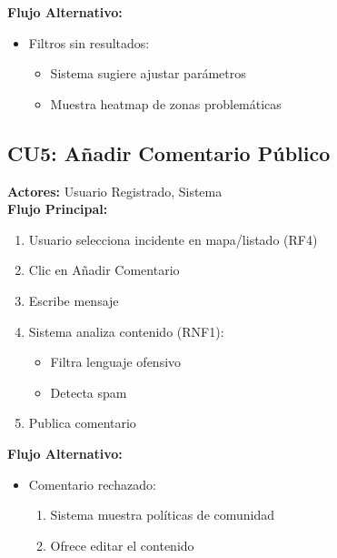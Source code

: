 \begin{multicols}{2}
\textbf{Flujo Alternativo:}
\begin{itemize}
    \item Filtros sin resultados:
    \begin{itemize}
        \item Sistema sugiere ajustar parámetros
        \item Muestra heatmap de zonas problemáticas
    \end{itemize}
\end{itemize}

\subsection*{CU5: Añadir Comentario Público}
\textbf{Actores:} Usuario Registrado, Sistema\\
\textbf{Flujo Principal:}
\begin{enumerate}
    \item Usuario selecciona incidente en mapa/listado (RF4)
    \item Clic en Añadir Comentario
    \item Escribe mensaje
    \item Sistema analiza contenido (RNF1):
    \begin{itemize}
        \item Filtra lenguaje ofensivo
        \item Detecta spam
    \end{itemize}
    \item Publica comentario
\end{enumerate}

\textbf{Flujo Alternativo:}
\begin{itemize}
    \item Comentario rechazado:
    \begin{enumerate}
        \item Sistema muestra políticas de comunidad
        \item Ofrece editar el contenido
    \end{enumerate}
\end{itemize}

\end{multicols}